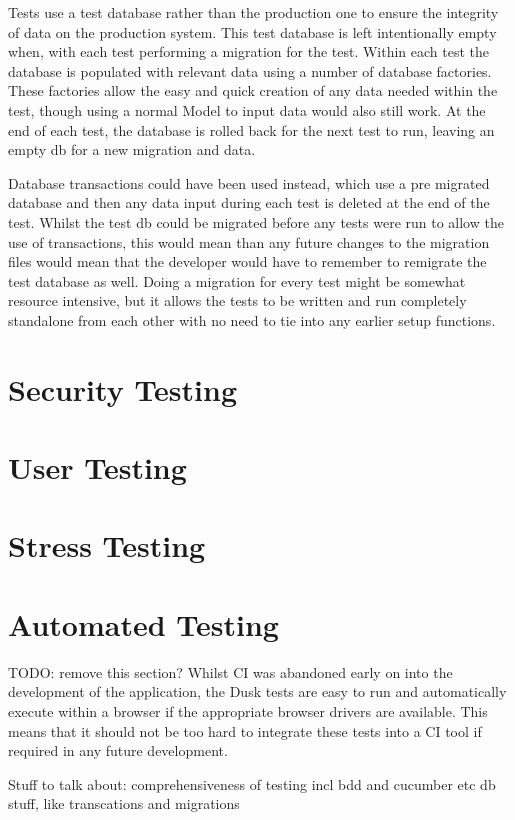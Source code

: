 Tests use a test database rather than the production one to ensure the integrity of data on the production system. This test database is left intentionally empty when, with each test performing a migration for the test. Within each test the database is populated with relevant data using a number of database factories. These factories allow the easy and quick creation of any data needed within the test, though using a normal Model to input data would also still work. At the end of each test, the database is rolled back for the next test to run, leaving an empty db for a new migration and data.

Database transactions could have been used instead, which use a pre migrated database and then any data input during each test is deleted at the end of the test. Whilst the test db could be migrated before any tests were run to allow the use of transactions, this would mean than any future changes to the migration files would mean that the developer would have to remember to remigrate the test database as well. Doing a migration for every test might be somewhat resource intensive, but it allows the tests to be written and run completely standalone from each other with no need to tie into any earlier setup functions. 

\section{Security Testing}


\section{User Testing}


\section{Stress Testing}


\section{Automated Testing}
TODO: remove this section?
Whilst CI was abandoned early on into the development of the application, the Dusk tests are easy to run and automatically execute within a browser if the appropriate browser drivers are available. This means that it should not be too hard to integrate these tests into a CI tool if required in any future development.


Stuff to talk about:
comprehensiveness of testing incl bdd and cucumber etc
db stuff, like transcations and migrations
